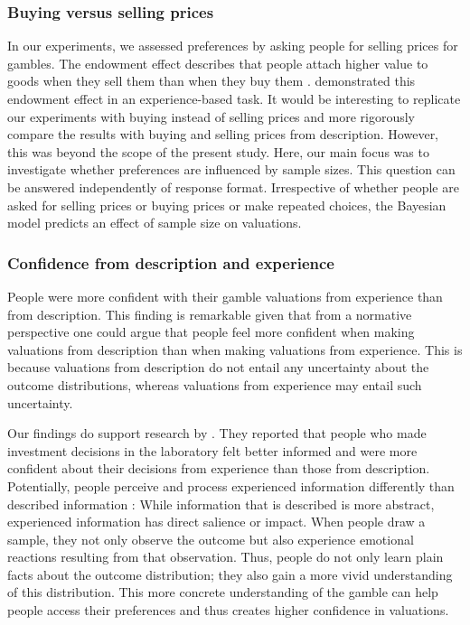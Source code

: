 \documentclass[a4paper,man, natbib]{apa6} %
\begin{document}
\subsubsection{Buying versus selling prices}
In our experiments, we assessed preferences by asking people for selling prices for gambles. %
The endowment effect describes that people attach higher value to goods when they sell them than when they buy them \citep{Thaler1980}. \cite{Pachur2012} demonstrated this endowment effect in an experience-based task. It would be interesting to replicate our experiments with buying instead of selling prices and more rigorously compare the results with buying and selling prices from description. However, this was beyond the scope of the present study. Here, our main focus was to investigate whether preferences are influenced by sample sizes. This question can be answered independently of response format. Irrespective of whether people are asked for selling prices or buying prices or make repeated choices, the Bayesian model predicts an effect of sample size on valuations. 



\subsubsection{Confidence from description and experience}
People were more confident with their gamble valuations from experience than from description. This finding is remarkable given that from a normative perspective one could argue that people feel more confident when making valuations from description than when making valuations from experience. This is because valuations from description do not entail any uncertainty about the outcome distributions, whereas valuations from experience may entail such uncertainty.

Our findings do support research by \cite{Bradbury2014}. They reported that people who made investment decisions in the laboratory felt better informed and were more confident about their decisions from experience than those from description.
Potentially, people perceive and process experienced information differently than described information \citep{Kahneman2009}: 
While information that is described is more abstract, experienced information has direct salience or impact. When people draw a sample, they not only observe the outcome but also experience emotional reactions resulting from that observation. Thus, people do not only learn plain facts about the outcome distribution; they also gain a more vivid understanding of this distribution. This more concrete understanding of the gamble can help people access their preferences and thus creates higher confidence in valuations.
\end{document}
